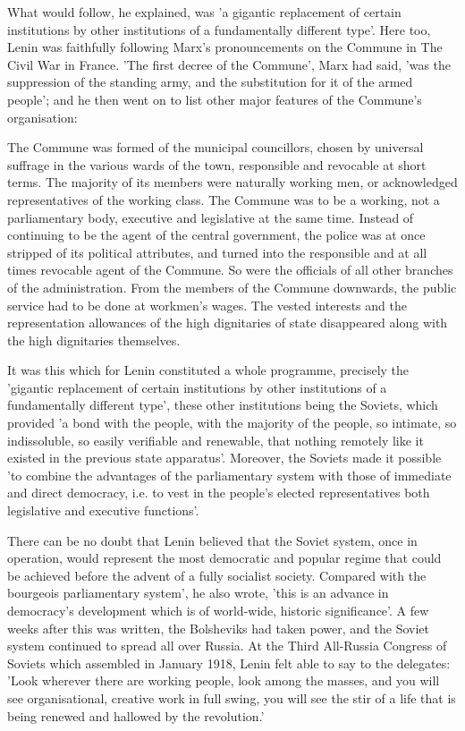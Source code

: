 What would follow, he explained, was 'a gigantic replacement of certain institutions by other institutions of a fundamentally different type'. Here too, Lenin was faithfully following Marx's pronouncements on the Commune in The Civil War in France. 'The first decree of the Commune', Marx had said, 'was the suppression of the standing army, and the substitution for it of the armed people'; and he then went on to list other major features of the Commune's organisation:
\begin{displayquote}
    The Commune was formed of the municipal councillors, chosen by universal suffrage in the various wards of the town, responsible and revocable at short terms. The majority of its members were naturally working men, or acknowledged representatives of the working class. The Commune was to be a working, not a parliamentary body, executive and legislative at the same time. Instead of continuing to be the agent of the central government, the police was at once stripped of its political attributes, and turned into the responsible and at all times revocable agent of the Commune. So were the officials of all other branches of the administration. From the members of the Commune downwards, the public service had to be done at workmen's wages. The vested interests and the representation allowances of the high dignitaries of state disappeared along with the high dignitaries themselves.
\end{displayquote}

It was this which for Lenin constituted a whole programme, precisely the 'gigantic replacement of certain institutions by other institutions of a fundamentally different type', these other institutions being the Soviets, which provided 'a bond with the people, with the majority of the people, so intimate, so indissoluble, so easily verifiable and renewable, that nothing remotely like it existed in the previous state apparatus'. Moreover, the Soviets made it possible 'to combine the advantages of the parliamentary system with those of immediate and direct democracy, i.e. to vest in the people's elected representatives both legislative and executive functions'.

There can be no doubt that Lenin believed that the Soviet system, once in operation, would represent the most democratic and popular regime that could be achieved before the advent of a fully socialist society. Compared with the bourgeois parliamentary system', he also wrote, 'this is an advance in democracy's development which is of world-wide, historic significance'. A few weeks after this was written, the Bolsheviks had taken power, and the Soviet system continued to spread all over Russia. At the Third All-Russia Congress of Soviets which assembled in January 1918, Lenin felt able to say to the delegates: 'Look wherever there are working people, look among the masses, and you will see organisational, creative work in full swing, you will see the stir of a life that is being renewed and hallowed by the revolution.'

